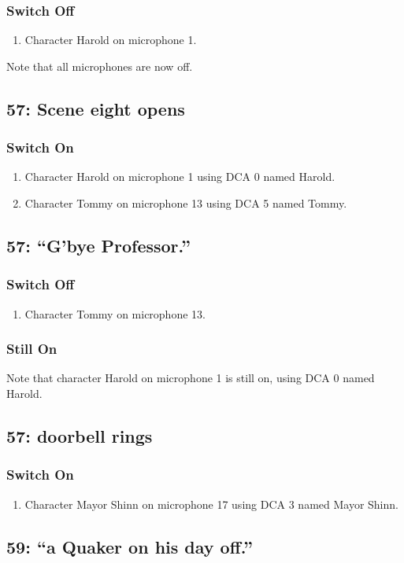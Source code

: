 \subsubsection* {Switch Off}
\begin{enumerate}
\item Character Harold on microphone 1.
\end{enumerate}
Note that all microphones are now off.
\subsection* {57: Scene eight opens}
\subsubsection* {Switch On}
\begin{enumerate}
\item Character Harold on microphone 1 using DCA 0 named Harold.
\item Character Tommy on microphone 13 using DCA 5 named Tommy.
\end{enumerate}
\subsection* {57: ``G'bye Professor.''}
\subsubsection* {Switch Off}
\begin{enumerate}
\item Character Tommy on microphone 13.
\end{enumerate}
\subsubsection* {Still On}
Note that character Harold on microphone 1 is still on, using DCA 0 named Harold.\subsection* {57: doorbell rings}
\subsubsection* {Switch On}
\begin{enumerate}
\item Character Mayor Shinn on microphone 17 using DCA 3 named Mayor Shinn.
\end{enumerate}
\subsection* {59: ``a Quaker on his day off.''}
